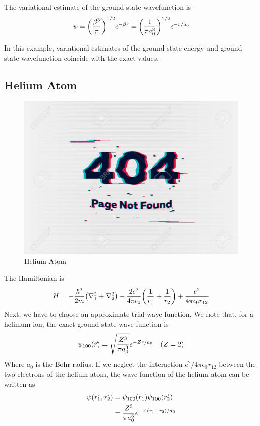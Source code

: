 		The variational estimate of the ground state wavefunction is
		\begin{align}
			\psi = \qty(\frac{\beta^3}{\pi})^{1/2} e^{-\beta r} = \qty(\frac{1}{\pi a_0^3})^{1/2} e^{-r/a_0}
		\end{align}
		
		In this example, variational estimates of the ground state energy and ground state wavefunction coincide with the exact values.
		
		
	
	\subsection{Helium Atom}
\begin{figure}
	\centering
	\includegraphics[width=0.5\linewidth]{Pictures/not-found.jpg}
	\caption{Helium Atom}
\end{figure}
	The Hamiltonian is
	\begin{align}
		H = - \frac{\hbar^2}{2 m} \qty(\nabla_1^2 + \nabla_2^2) - \frac{2 e^2}{4 \pi \epsilon_0} \qty(\frac{1}{r_1} + \frac{1}{r_2})  +  \frac{e^2}{4 \pi \epsilon_0 r_{1 2}}
	\end{align}
	Next, we have to choose an approximate trial wave function. We note that, for a helimum ion, the exact ground state wave function is
	\begin{align}
		\psi_{1 0 0}\qty(\vec{r}) = \sqrt{\frac{Z^3}{\pi a_0^3}} e^{-Z r / a_0} \quad (Z=2)
	\end{align}
	Where $a_0$ is the Bohr radius. If we neglect the interaction $e^2 / 4\pi \epsilon_0 r_{1 2}$ between the two electrons of the helium atom, the wave function of the helium atom can be written as
	\begin{align*}
		\psi\qty(\vec{r_1}, \vec{r_2}) 
		&= \psi_{1 0 0}\qty(\vec{r_1}) \psi_{1 0 0}\qty(\vec{r_2}) \\
		&= \frac{Z^3}{\pi a_0^3} e^{-Z \qty(r_1 + r_2)/a_0}
	\end{align*}
	
